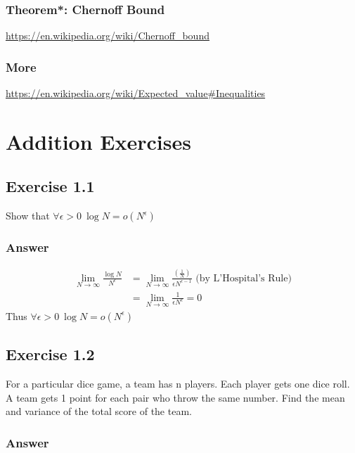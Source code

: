 \documentclass[a4paper]{article}
\begin{document}
\subsubsection{Theorem*: Chernoff Bound}

\url{https://en.wikipedia.org/wiki/Chernoff_bound}

\subsubsection{More}

\url{https://en.wikipedia.org/wiki/Expected_value\#Inequalities}

\section{Addition Exercises}

\subsection{Exercise 1.1}

Show that $\forall \epsilon>0\ \log N = o(N^\epsilon)$

\subsubsection{Answer}

\begin{equation*}
\begin{split}
\lim_{N\to\infty}\frac{\log N}{N^\epsilon} & = \lim_{N\to\infty}\frac{(\frac{1}{N})}{\epsilon N^{\epsilon-1}} \text{ (by L'Hospital's Rule)} \\
& = \lim_{N\to\infty}\frac{1}{\epsilon N^\epsilon} = 0
\end{split}
\end{equation*}
Thus $\forall \epsilon>0\ \log N = o(N^\epsilon)$

\subsection{Exercise 1.2}

For a particular dice game, a team has n players. Each player gets one dice roll. A team gets 1 point for each pair who throw the same number. Find the mean and variance of the total score of the team.

\subsubsection{Answer}
\end{document}
